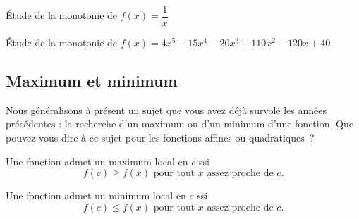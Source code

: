 \documentclass[a4paper,12pt]{article}
\begin{document}
\begin{exemple}
	\tcblower
	Étude de la monotonie de $f(x)=\dfrac{1}{x}$
	\vspace{6cm}	
\end{exemple}
\begin{exemple}
	\tcblower
	Étude de la monotonie de $f(x)=4x^5-15x^4-20x^3+110x^2-120x+40$
	\vspace{14cm}
\end{exemple}

\subsection{Maximum et minimum}

\begin{discussion}
	\tcblower
Nous généralisons à présent un sujet que vous avez déjà survolé les années précédentes : la recherche d'un maximum ou d'un minimum d'une fonction. Que pouvez-vous dire à ce sujet pour les fonctions affines ou quadratiques~?
\end{discussion}

\begin{definition}
	\tcblower
	Une fonction admet un maximum local en $c$ ssi
	\[f(c)\geq f(x) \text{ pour tout } x \text{ assez proche de } c.\]

Une fonction admet un minimum local en $c$ ssi
	\[f(c)\leq f(x) \text{ pour tout } x \text{ assez proche de } c.\]
\end{definition}
\end{document}

